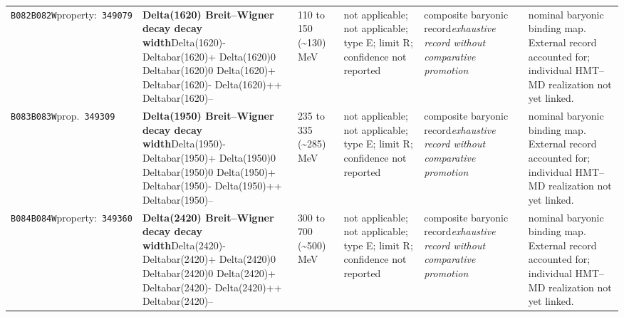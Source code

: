 \begin{landscape}
\begin{longtable}{L{1.85cm}L{4.45cm}L{2.35cm}L{4.05cm}L{3.35cm}L{7.15cm}}
\texttt{B082}\newline \texttt{B082W}\newline property:\ \texttt{349079} & \textbf{Delta(1620) Breit--Wigner decay decay width}\newline Delta(1620)- \textbar{}\allowbreak{} Deltabar(1620)+ \textbar{}\allowbreak{} Delta(1620)0 \textbar{}\allowbreak{} Deltabar(1620)0 \textbar{}\allowbreak{} Delta(1620)+ \textbar{}\allowbreak{} Deltabar(1620)- \textbar{}\allowbreak{} Delta(1620)++ \textbar{}\allowbreak{} Deltabar(1620)-- & 110 to 150 (\textasciitilde{}130)\,MeV & not applicable; not applicable; type E; limit R; confidence not reported & composite baryonic record\newline \emph{exhaustive record without comparative promotion} & nominal baryonic binding map. External record accounted for; individual HMT--MD realization not yet linked. \\
\texttt{B083}\newline \texttt{B083W}\newline prop.\ \texttt{349309} & \textbf{Delta(1950) Breit--Wigner decay decay width}\newline Delta(1950)- \textbar{}\allowbreak{} Deltabar(1950)+ \textbar{}\allowbreak{} Delta(1950)0 \textbar{}\allowbreak{} Deltabar(1950)0 \textbar{}\allowbreak{} Delta(1950)+ \textbar{}\allowbreak{} Deltabar(1950)- \textbar{}\allowbreak{} Delta(1950)++ \textbar{}\allowbreak{} Deltabar(1950)-- & 235 to 335 (\textasciitilde{}285)\,MeV & not applicable; not applicable; type E; limit R; confidence not reported & composite baryonic record\newline \emph{exhaustive record without comparative promotion} & nominal baryonic binding map. External record accounted for; individual HMT--MD realization not yet linked. \\
\texttt{B084}\newline \texttt{B084W}\newline property:\ \texttt{349360} & \textbf{Delta(2420) Breit--Wigner decay decay width}\newline Delta(2420)- \textbar{}\allowbreak{} Deltabar(2420)+ \textbar{}\allowbreak{} Delta(2420)0 \textbar{}\allowbreak{} Deltabar(2420)0 \textbar{}\allowbreak{} Delta(2420)+ \textbar{}\allowbreak{} Deltabar(2420)- \textbar{}\allowbreak{} Delta(2420)++ \textbar{}\allowbreak{} Deltabar(2420)-- & 300 to 700 (\textasciitilde{}500)\,MeV & not applicable; not applicable; type E; limit R; confidence not reported & composite baryonic record\newline \emph{exhaustive record without comparative promotion} & nominal baryonic binding map. External record accounted for; individual HMT--MD realization not yet linked. \\

\end{longtable}
\end{landscape}
